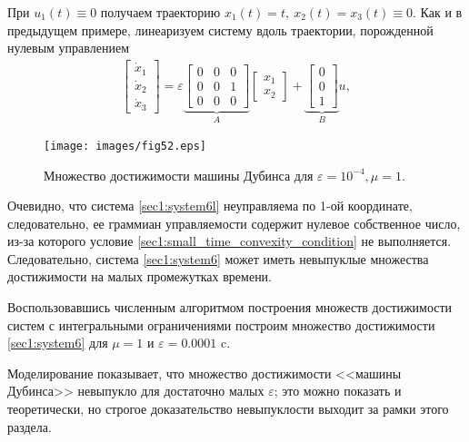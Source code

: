 \documentclass[../main.tex]{subfiles}
\begin{document}
При $  u_1(t) \equiv 0 $ получаем траекторию $ x_1(t) = t, \ x_2(t) = x_3(t) \equiv 0 $.
Как и в предыдущем примере, линеаризуем систему вдоль траектории, порожденной нулевым управлением
\begin{gather}\label{sec1:system6l}
     \left[ {\begin{array}{*{20}{c}}
             {{{\dot x}_1}}\\
             {{{\dot x}_2}}\\
             {{{\dot x}_3}}
     \end{array}} \right] = \varepsilon \underbrace {\left[ {\begin{array}{*{20}{c}}
                 0&0&0\\
                 0&0&1\\
                 0&0&0
         \end{array}} \right]}_A\left[ {\begin{array}{*{20}{c}}
             {{x_1}}\\
             {{x_2}}
     \end{array}} \right] + \underbrace {\left[ {\begin{array}{*{20}{c}}
                 0\\
                 0\\
                 1
         \end{array}} \right]}_Bu ,
\end{gather}
\begin{figure}[h]
     \centering
     \texttt{[image: images/fig52.eps]}
     \caption{Множество достижимости машины Дубинса для $\varepsilon = 10^{-4}, \mu = 1$.}
     \label{sec1:fig:fig3}
\end{figure}
Очевидно, что система \eqref{sec1:system6l} неуправляема по 1-ой координате, следовательно, ее граммиан управляемости содержит нулевое собственное число, из-за которого условие \eqref{sec1:small_time_convexity_condition} не выполняется.
Следовательно, система \eqref{sec1:system6} может иметь невыпуклые множества достижимости на малых промежутках времени.
 
Воспользовавшись численным алгоритмом построения множеств достижимости систем с интегральными ограничениями \cite{GusevZykov2018} построим множество достижимости \eqref{sec1:system6} для $ \mu = 1  $ и $ \varepsilon = 0.0001  $ c. 
 
Моделирование показывает, что множество достижимости <<машины Дубинса>> невыпукло для достаточно малых $ \varepsilon $; это можно показать и теоретически, но строгое доказательство невыпуклости выходит за рамки этого раздела.
 
\end{document}
